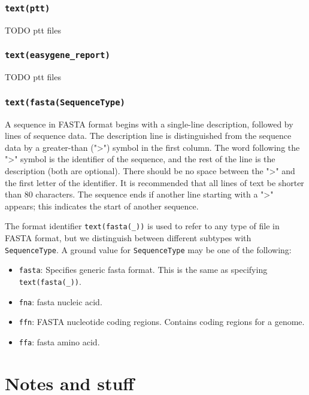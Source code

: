 \documentclass{book}
\begin{document}
\subsection{\texttt{text(ptt)}}

TODO ptt files

\subsection{\texttt{text(easygene\_report)}}

TODO ptt files

\subsection{\texttt{text(fasta(SequenceType)}}

A sequence in FASTA format begins with a single-line description,
followed by lines of sequence data. The description line is
distinguished from the sequence data by a greater-than (">") symbol in
the first column. The word following the ">" symbol is the identifier
of the sequence, and the rest of the line is the description (both are
optional). There should be no space between the ">" and the first
letter of the identifier. It is recommended that all lines of text be
shorter than 80 characters. The sequence ends if another line starting
with a ">" appears; this indicates the start of another sequence. 

The format identifier \texttt{text(fasta(\_))} is used to refer to any
type of file in FASTA format, but we distinguish between different 
subtypes with \texttt{SequenceType}. A ground value for
\texttt{SequenceType} may be one of the following:

\begin{itemize}
\item \texttt{fasta}: Specifies generic fasta format. This is the same
  as specifying \texttt{text(fasta(\_))}.
\item \texttt{fna}: fasta nucleic acid. 
\item \texttt{ffn}: FASTA nucleotide coding regions. Contains coding
  regions for a genome.
\item \texttt{ffa}: fasta amino acid.
\end{itemize}

\chapter{Notes and stuff}
\end{document}
